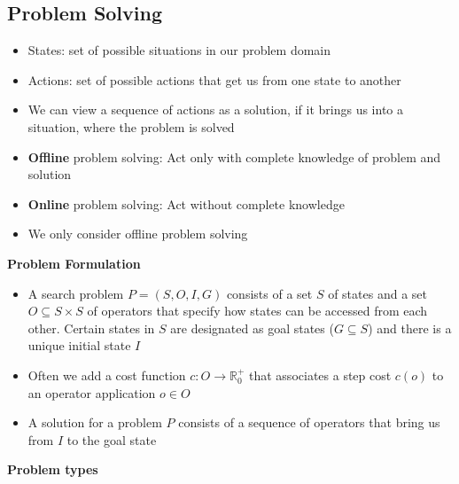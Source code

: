 \documentclass{scrartcl}
\begin{document}
\subsection{Problem Solving}
\begin{itemize}
    \item
        States: set of possible situations in our problem domain
    \item
        Actions: set of possible actions that get us from one state to another
    \item
        We can view a sequence of actions as a solution, if it brings us into a situation, where the problem is solved
    \item
        \textbf{Offline} problem solving: Act only with complete knowledge of problem and solution
    \item
        \textbf{Online} problem solving: Act without complete knowledge
    \item
        We only consider offline problem solving
\end{itemize}
\textbf{Problem Formulation}
\begin{itemize}
    \item
        A search problem $P =  (S, O, I, G)$ consists of a set $S$ of states and a set $O \subseteq S \times S$ of operators that specify how states can be accessed from each other. Certain states in $S$ are designated as goal states ($G \subseteq S$) and there is a unique initial state $I$
    \item
        Often we add a cost function $c: O \rightarrow \mathbb{R}_0^+$ that associates a step cost $c(o)$ to an operator application $o \in O$
    \item
        A solution for a problem $P$ consists of a sequence of operators that bring us from $I$ to the goal state
\end{itemize}
\textbf{Problem types}
\end{document}
